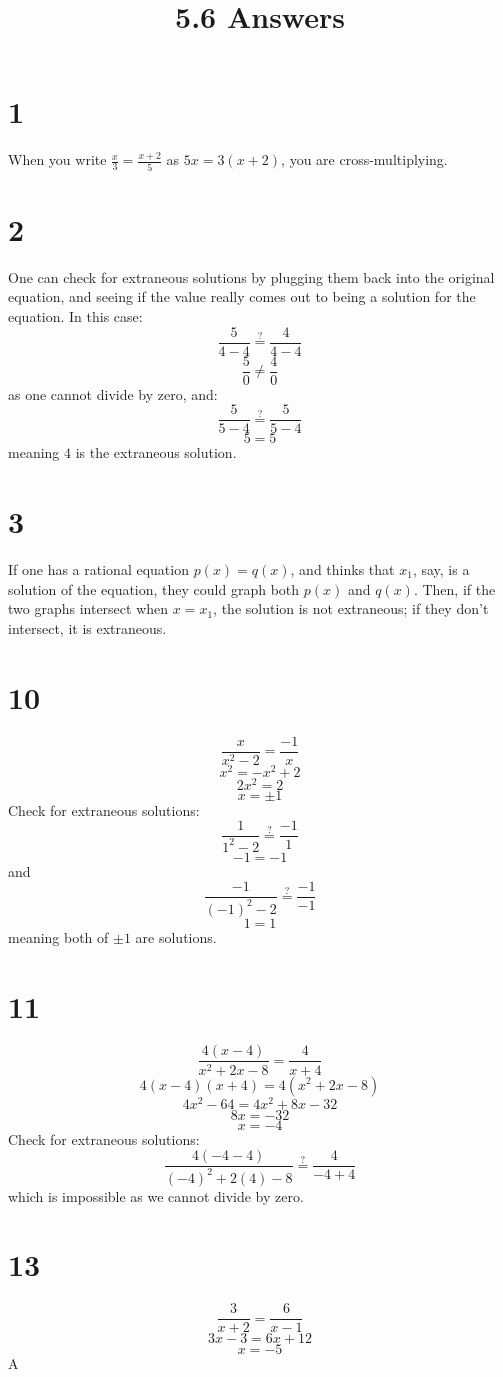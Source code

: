 \documentclass{article}
\title{5.6 Answers}
\theoremstyle{definition}
\newcommand{\?}{\stackrel{?}{=}}
\begin{document}
\maketitle

\section*{1}
When you write $\frac{x}{3}=\frac{x+2}{5}$ as $5x=3(x+2)$, you are cross-multiplying.

\section*{2}
One can check for extraneous solutions by plugging them back into the original equation, and seeing if the value really comes out to being a solution for the 
equation. In this case:
\[ \frac{5}{4-4}\?\frac{4}{4-4} \] \[ \frac{5}{0}\ne\frac{4}{0} \] as one cannot divide by zero, and:
\[ \frac{5}{5-4}\?\frac{5}{5-4} \] \[ 5=5 \] meaning $4$ is the extraneous solution.

\section*{3}
If one has a rational equation $p(x)=q(x)$, and thinks that $x_1$, say, is a solution of the equation, they could graph both $p(x)$ and $q(x)$. Then, if 
the two graphs intersect when $x=x_1$, the solution is not extraneous; if they don't intersect, it is extraneous.

\section*{10}
\[ \frac{x}{x^2-2}=\frac{-1}{x} \] \[ x^2=-x^2+2 \] \[ 2x^2=2 \] \[ x=\pm 1 \]
Check for extraneous solutions: \[ \frac{1}{1^2-2}\?\frac{-1}{1} \] \[ -1=-1 \] and \[ \frac{-1}{(-1)^2-2}\?\frac{-1}{-1} \] \[ 1=1 \] meaning both of $\pm 1$ are solutions.

\section*{11}
\[ \frac{4(x-4)}{x^2+2x-8}=\frac{4}{x+4} \] \[ 4(x-4)(x+4)=4(x^2+2x-8) \] \[ 4x^2-64=4x^2+8x-32 \] \[ 8x=-32 \] \[ x=-4 \]
Check for extraneous solutions: \[ \frac{4(-4-4)}{(-4)^2+2(4)-8}\?\frac{4}{-4+4} \] which is impossible as we cannot divide by zero.

\section*{13}
\[ \frac{3}{x+2}=\frac{6}{x-1} \] \[ 3x-3=6x+12 \] \[ x=-5 \]
A
\end{document}
